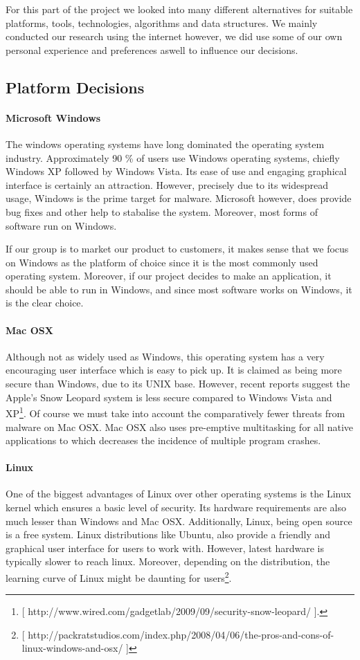 
For this part of the project we looked into many different alternatives for suitable platforms,
tools, technologies, algorithms and data structures. We mainly conducted our research using the internet however, 
we did use some of our own personal experience and preferences aswell to influence our decisions.

\subsection{Platform Decisions}

\paragraph{Microsoft Windows}
The windows operating systems have long dominated the operating system industry. Approximately 90 \% of users use Windows operating systems, chiefly Windows XP followed by Windows Vista. Its ease of use and engaging graphical interface is certainly an attraction. However, precisely due to its widespread usage, Windows is the prime target for malware. Microsoft however, does provide bug fixes and other help to stabalise the system. Moreover, most forms of software run on Windows.

If our group is to market our product to customers, it makes sense that we focus on Windows as the platform of choice since it is the most commonly used operating system. Moreover, if our project decides to make an application, it should be able to run in Windows, and since most software works on Windows, it is the clear choice.

\paragraph{Mac OSX}
Although not as widely used as Windows, this operating system has a very encouraging user interface which is easy to pick up. It is claimed as being more secure than Windows, due to its UNIX base. However, recent reports suggest the Apple’s Snow Leopard system is less secure compared to Windows Vista and XP\footnote{ [ http://www.wired.com/gadgetlab/2009/09/security-snow-leopard/ ].}. Of course we must take into account the comparatively fewer threats from malware on Mac OSX. 
Mac OSX also uses pre-emptive multitasking for all native applications to which decreases the incidence of multiple program crashes.

\paragraph{Linux}
One of the biggest advantages of Linux over other operating systems is the Linux kernel which ensures a basic level of security. Its hardware requirements are also much lesser than Windows and Mac OSX. Additionally, Linux, being open source is a free system. Linux distributions like Ubuntu, also provide a friendly and graphical user interface for users to work with. However, latest hardware is typically slower to reach linux. Moreover, depending on the distribution, the learning curve of Linux might be daunting for users\footnote{[ http://packratstudios.com/index.php/2008/04/06/the-pros-and-cons-of-linux-windows-and-osx/ ]}.

